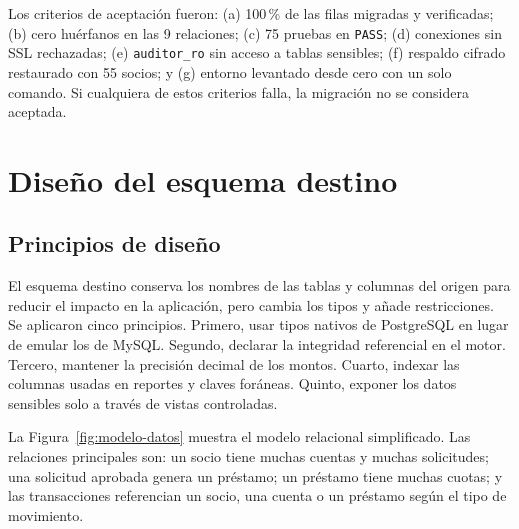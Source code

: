 Los criterios de aceptación fueron: (a) 100\,\% de las filas migradas y
verificadas; (b) cero huérfanos en las 9 relaciones; (c) 75 pruebas en
\texttt{PASS}; (d) conexiones sin SSL rechazadas; (e) \texttt{auditor\_ro} sin
acceso a tablas sensibles; (f) respaldo cifrado restaurado con 55 socios; y
(g) entorno levantado desde cero con un solo comando. Si cualquiera de estos
criterios falla, la migración no se considera aceptada.

\section{Diseño del esquema destino}

\subsection{Principios de diseño}

El esquema destino conserva los nombres de las tablas y columnas del origen
para reducir el impacto en la aplicación, pero cambia los tipos y añade
restricciones. Se aplicaron cinco principios. Primero, usar tipos nativos de
PostgreSQL en lugar de emular los de MySQL. Segundo, declarar la integridad
referencial en el motor. Tercero, mantener la precisión decimal de los montos.
Cuarto, indexar las columnas usadas en reportes y claves foráneas. Quinto,
exponer los datos sensibles solo a través de vistas controladas.

La Figura~\ref{fig:modelo-datos} muestra el modelo relacional simplificado.
Las relaciones principales son: un socio tiene muchas cuentas y muchas
solicitudes; una solicitud aprobada genera un préstamo; un préstamo tiene
muchas cuotas; y las transacciones referencian un socio, una cuenta o un
préstamo según el tipo de movimiento.

